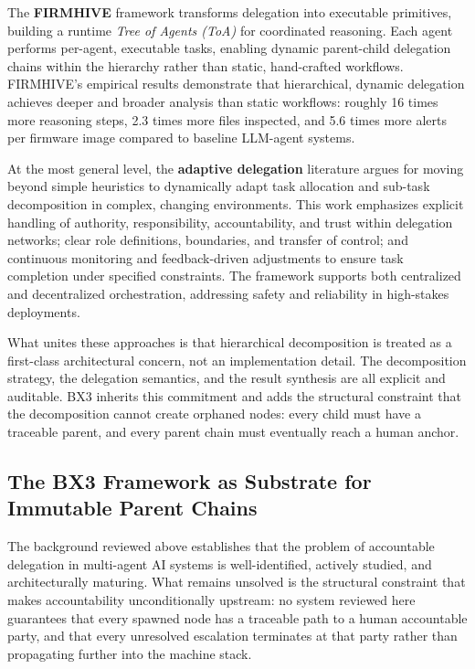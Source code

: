 The \textbf{FIRMHIVE} framework \cite{firmhive2025} transforms delegation into executable primitives, building a runtime \textit{Tree of Agents (ToA)} for coordinated reasoning. Each agent performs per-agent, executable tasks, enabling dynamic parent-child delegation chains within the hierarchy rather than static, hand-crafted workflows. FIRMHIVE's empirical results demonstrate that hierarchical, dynamic delegation achieves deeper and broader analysis than static workflows: roughly 16 times more reasoning steps, 2.3 times more files inspected, and 5.6 times more alerts per firmware image compared to baseline LLM-agent systems.

At the most general level, the \textbf{adaptive delegation} literature \cite{agenthive2025} argues for moving beyond simple heuristics to dynamically adapt task allocation and sub-task decomposition in complex, changing environments. This work emphasizes explicit handling of authority, responsibility, accountability, and trust within delegation networks; clear role definitions, boundaries, and transfer of control; and continuous monitoring and feedback-driven adjustments to ensure task completion under specified constraints. The framework supports both centralized and decentralized orchestration, addressing safety and reliability in high-stakes deployments.

What unites these approaches is that hierarchical decomposition is treated as a first-class architectural concern, not an implementation detail. The decomposition strategy, the delegation semantics, and the result synthesis are all explicit and auditable. BX3 inherits this commitment and adds the structural constraint that the decomposition cannot create orphaned nodes: every child must have a traceable parent, and every parent chain must eventually reach a human anchor.

\subsection{The BX3 Framework as Substrate for Immutable Parent Chains}

The background reviewed above establishes that the problem of accountable delegation in multi-agent AI systems is well-identified, actively studied, and architecturally maturing. What remains unsolved is the structural constraint that makes accountability unconditionally upstream: no system reviewed here guarantees that every spawned node has a traceable path to a human accountable party, and that every unresolved escalation terminates at that party rather than propagating further into the machine stack.

